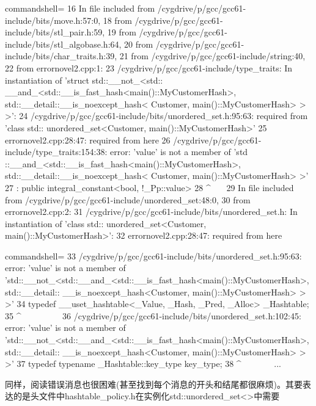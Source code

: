 {\scriptsize
\begin{tcblisting}{commandshell={}}
16 In file included from /cygdrive/p/gcc/gcc61-include/bits/move.h:57:0,
18                  from /cygdrive/p/gcc/gcc61-include/bits/stl_pair.h:59,
19                  from /cygdrive/p/gcc/gcc61-include/bits/stl_algobase.h:64,
20 from /cygdrive/p/gcc/gcc61-include/bits/char_traits.h:39,
21                  from /cygdrive/p/gcc/gcc61-include/string:40,
22                  from errornovel2.cpp:1:
23 /cygdrive/p/gcc/gcc61-include/type_traits: In instantiation of ’struct std::__not_<std::
   __and_<std::__is_fast_hash<main()::MyCustomerHash>, std::__detail::__is_noexcept_hash<
   Customer, main()::MyCustomerHash> > >’:
24 /cygdrive/p/gcc/gcc61-include/bits/unordered_set.h:95:63: required from ’class std::
   unordered_set<Customer, main()::MyCustomerHash>’
25 errornovel2.cpp:28:47: required from here
26 /cygdrive/p/gcc/gcc61-include/type_traits:154:38: error: ’value’ is not a member of ’std
   ::__and_<std::__is_fast_hash<main()::MyCustomerHash>, std::__detail::__is_noexcept_hash<
   Customer, main()::MyCustomerHash> >’
27      : public integral_constant<bool, !_Pp::value>
28                                                  ^~~~
29 In file included from /cygdrive/p/gcc/gcc61-include/unordered_set:48:0,
30                  from errornovel2.cpp:2:
31 /cygdrive/p/gcc/gcc61-include/bits/unordered_set.h: In instantiation of ’class std::
   unordered_set<Customer, main()::MyCustomerHash>’:
32 errornovel2.cpp:28:47: required from here
\end{tcblisting}
}
{\scriptsize
\begin{tcblisting}{commandshell={}}
33 /cygdrive/p/gcc/gcc61-include/bits/unordered_set.h:95:63: error: ’value’ is not a member
   of ’std::__not_<std::__and_<std::__is_fast_hash<main()::MyCustomerHash>, std::__detail::
   __is_noexcept_hash<Customer, main()::MyCustomerHash> > >’
34        typedef __uset_hashtable<_Value, _Hash, _Pred, _Alloc> _Hashtable;
35                                                                                  ^~~~~~~~~~
36 /cygdrive/p/gcc/gcc61-include/bits/unordered_set.h:102:45: error: ’value’ is not a member
   of ’std::__not_<std::__and_<std::__is_fast_hash<main()::MyCustomerHash>, std::__detail::
   __is_noexcept_hash<Customer, main()::MyCustomerHash> > >’
37 typedef typename _Hashtable::key_type key_type;
38                                                     ^~~~~~~~
...
\end{tcblisting}
}

同样，阅读错误消息也很困难(甚至找到每个消息的开头和结尾都很麻烦)。其要表达的是头文件中hashtable\_policy.h在实例化std::unordered\_set<>中需要


